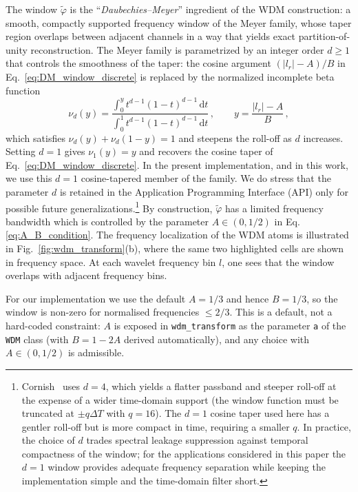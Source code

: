 \documentclass[twocolumn,preprintnumbers,
  superscriptaddress,
  nofootinbib,
  amsmath,
  amssymb,
  aps,
  prd,
  colorlinks=true,
  linkcolor=blue,
  urlcolor=blue,
  citecolor=blue,
  anchorcolor=blue
]{revtex4-2}
\begin{document}
The window $\tilde\varphi$ is the ``\emph{Daubechies--Meyer}''
ingredient of the WDM construction: a smooth, compactly supported
frequency window of the Meyer family, whose taper region overlaps
between adjacent channels in a way that yields exact partition-of-unity
reconstruction. The Meyer family is parametrized by an integer order
$d \geq 1$ that controls the smoothness of the taper: the cosine
argument $(|l_r|-A)/B$ in Eq.~\eqref{eq:DM_window_discrete} is replaced
by the normalized incomplete beta function
\begin{equation}\label{eq:nu_d_def}
  \nu_d(y) = \frac{\int_0^y t^{d-1}(1-t)^{d-1}\,\mathrm{d}t}
                  {\int_0^1 t^{d-1}(1-t)^{d-1}\,\mathrm{d}t}\,,
  \qquad y = \frac{|l_r|-A}{B}\,,
\end{equation}
which satisfies $\nu_d(y) + \nu_d(1-y) = 1$ and steepens the roll-off
as $d$ increases. Setting $d=1$ gives $\nu_1(y)=y$ and recovers the
cosine taper of Eq.~\eqref{eq:DM_window_discrete}. In the present
implementation, and in this work, we use this
$d=1$ cosine-tapered member of the family. We do stress that the parameter $d$ is retained in the Application Programming Interface (API) only for
possible future
generalizations.\footnote{Cornish~\cite{Cornish:2020odn} uses $d=4$,
  which yields a flatter passband and steeper roll-off at the expense
  of a wider time-domain support (the window function must be truncated
  at $\pm q\Delta T$ with $q=16$). The $d=1$ cosine taper used here has
  a gentler roll-off but is more compact in time, requiring a smaller
  $q$. In practice, the choice of $d$ trades spectral leakage
  suppression against temporal compactness of the window; for the
  applications considered in this paper the $d=1$ window provides
  adequate frequency separation while keeping the implementation simple
and the time-domain filter short.} By construction, $\tilde\varphi$ has a limited frequency bandwidth
which is controlled by the parameter $A\in(0,1/2)$ in Eq.\eqref{eq:A_B_condition}. 
The frequency localization of the WDM atoms is illustrated in Fig.~\ref{fig:wdm_transform}(b), where the same two highlighted cells are shown in frequency space.
At each wavelet frequency bin $l$, one sees that the window overlaps with adjacent frequency bins.  

For our implementation we use the default $A =1/3$ and
hence $B = 1/3$, so the window is non-zero for normalised frequencies
$\leq 2/3$. This is a default, not a hard-coded
constraint: $A$ is exposed in \texttt{wdm\_transform} as the
parameter \texttt{a} of the \texttt{WDM} class (with $B=1-2A$ derived
automatically), and any choice with $A\in(0,1/2)$ is admissible.%
\end{document}
